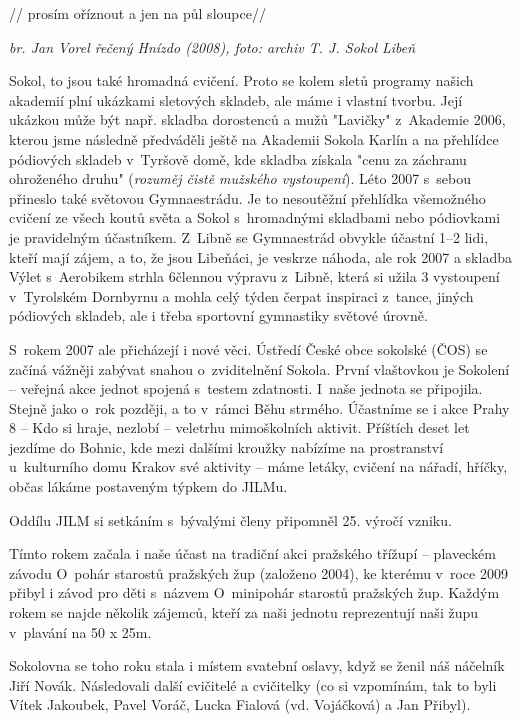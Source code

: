 \documentclass[a5paper, 12pt, twoside]{article}
\begin{document}
// prosím oříznout a jen na půl sloupce//

\textit{br. Jan Vorel řečený Hnízdo (2008), foto: archiv T. J. Sokol
Libeň}

Sokol, to jsou také hromadná cvičení. Proto se kolem sletů programy
našich akademií plní ukázkami sletových skladeb, ale máme i vlastní
tvorbu. Její ukázkou může být např. skladba dorostenců a mužů "Lavičky"
z~Akademie 2006, kterou jsme následně předváděli ještě na Akademii
Sokola Karlín a na přehlídce pódiových skladeb v~Tyršově domě, kde
skladba získala "cenu za záchranu ohroženého druhu" (\textit{rozuměj
čistě mužského vystoupení}). Léto 2007 s~sebou přineslo také světovou
Gymnaestrádu. Je to nesoutěžní přehlídka všemožného cvičení ze všech
koutů světa a Sokol s~hromadnými skladbami nebo pódiovkami je
pravidelným účastníkem. Z~Libně se Gymnaestrád obvykle účastní 1--2
lidi, kteří mají zájem, a to, že jsou Libeňáci, je veskrze náhoda, ale
rok 2007 a skladba Výlet s~Aerobikem strhla 6člennou výpravu z~Libně,
která si užila 3 vystoupení v~Tyrolském Dornbyrnu a mohla celý týden
čerpat inspiraci z~tance, jiných pódiových skladeb, ale i třeba
sportovní gymnastiky světové úrovně.

S~rokem 2007 ale přicházejí i nové věci. Ústředí České obce sokolské
(ČOS) se začíná vážněji zabývat snahou o~zviditelnění Sokola. První
vlaštovkou je Sokolení -- veřejná akce jednot spojená s~testem
zdatnosti. I~naše jednota se připojila. Stejně jako o~rok později, a to
v~rámci Běhu strmého. Účastníme se i akce Prahy 8 -- Kdo si hraje,
nezlobí -- veletrhu mimoškolních aktivit. Příštích deset let jezdíme do
Bohnic, kde mezi dalšími kroužky nabízíme na prostranství u~kulturního
domu Krakov své aktivity -- máme letáky, cvičení na nářadí, hříčky,
občas lákáme postaveným týpkem do JILMu.

Oddílu JILM si setkáním s~bývalými členy připomněl 25. výročí vzniku.

Tímto rokem začala i naše účast na tradiční akci pražského třížupí --
plaveckém závodu O~pohár starostů pražských žup (založeno 2004), ke
kterému v~roce 2009 přibyl i závod pro děti s~názvem O~minipohár
starostů pražských žup. Každým rokem se najde několik zájemců, kteří za
naši jednotu reprezentují naši župu v~plavání na 50 x 25m.

Sokolovna se toho roku stala i místem svatební oslavy, když se ženil náš
náčelník Jiří Novák. Následovali další cvičitelé a cvičitelky (co si
vzpomínám, tak to byli Vítek Jakoubek, Pavel Voráč, Lucka Fialová (vd.
Vojáčková) a Jan Přibyl).
\end{document}
